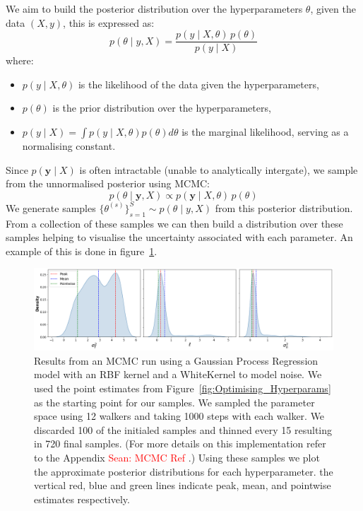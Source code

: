 \documentclass{ucdgradtaughtthesis}
\newcommand{\Sean}[1]{{\textcolor{red}{{Sean: #1}} }}
\begin{document}
We aim to build the posterior distribution over the hyperparameters \( \theta \), given the data \((X, y)\), this is expressed as:
%
\begin{equation}
p(\theta \mid y, X) = \frac{p(y \mid X, \theta) \, p(\theta)}{p(y \mid X)}
\end{equation}
where:
\begin{itemize}
    \item \( p(y \mid X, \theta) \) is the likelihood of the data given the hyperparameters,
    \item \( p(\theta) \) is the prior distribution over the hyperparameters,
    \item \( p(y \mid X) = \int p(y \mid X,\theta)p(\theta)d\theta \) is the marginal likelihood, serving as a normalising constant.
\end{itemize}
Since \( p(\mathbf{y} \mid X) \) is often intractable (unable to analytically intergate), we sample from the unnormalised posterior using MCMC:
\begin{equation}
p(\theta \mid \mathbf{y}, X) \propto p(\mathbf{y} \mid X, \theta) \, p(\theta)
\end{equation}
%
%
We generate samples \( \{\theta^{(s)}\}_{s=1}^S \sim p(\theta \mid y, X) \) from this posterior distribution.
From a collection of these samples we can then build a distribution over these samples helping to visualise the uncertainty associated with each parameter. An example of this is done in figure~\ref{fig:MCMCresults}.
\begin{figure}[H]
    \centering
    \includegraphics[width=\textwidth]{LatexPlots/1dplots/MCMCdistribution.png}
    \caption[Visualising the posterior distribution of the hyper-parameters using MCMC.]{
    Results from an MCMC run using a Gaussian Process Regression model with an RBF kernel and a WhiteKernel to model noise. We used the point estimates from Figure~\ref{fig:Optimising_Hyperparams} as the starting point 
    for our samples. We sampled the parameter space using 12 walkers and taking 1000 steps with each walker. We discarded 100 of the initialed samples and thinned every 15 resulting in 720 final samples. (For more details on this implementation refer to the Appendix \Sean{MCMC Ref}.)
    Using these samples we plot the approximate posterior distributions for each hyperparameter. 
    the vertical red, blue and green lines indicate peak, mean, and pointwise estimates respectively.}
    \label{fig:MCMCresults}
\end{figure}
\end{document}
